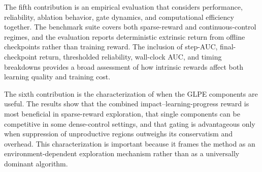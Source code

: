 The fifth contribution is an empirical evaluation that considers performance, reliability, ablation behavior, gate dynamics, and computational efficiency together.
The benchmark suite covers both sparse-reward and continuous-control regimes, and the evaluation reports deterministic extrinsic return from offline checkpoints rather than training reward.
The inclusion of step-AUC, final-checkpoint return, thresholded reliability, wall-clock AUC, and timing breakdowns provides a broad assessment of how intrinsic rewards affect both learning quality and training cost.

The sixth contribution is the characterization of when the GLPE components are useful.
The results show that the combined impact--learning-progress reward is most beneficial in sparse-reward exploration, that single components can be competitive in some dense-control settings, and that gating is advantageous only when suppression of unproductive regions outweighs its conservatism and overhead.
This characterization is important because it frames the method as an environment-dependent exploration mechanism rather than as a universally dominant algorithm.